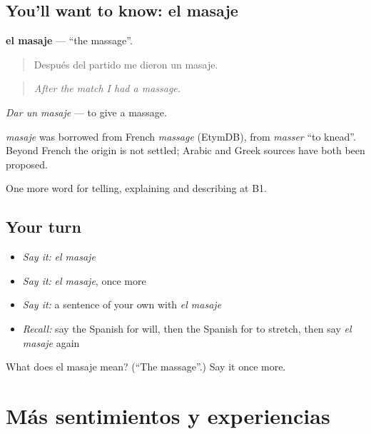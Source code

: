 \subsection*{You'll want to know: el masaje}
\textbf{el masaje} — \textquotedblleft{}the massage\textquotedblright{}.

\begin{quote}
Después del partido me dieron un masaje.
\end{quote}

\begin{quote}
\emph{After the match I had a massage.}
\end{quote}

\emph{Dar un masaje} — to give a massage.

\begin{cousinweb}
\emph{masaje} was borrowed from French \emph{massage} (EtymDB), from \emph{masser} \textquotedblleft{}to knead\textquotedblright{}. Beyond French the origin is not settled; Arabic and Greek sources have both been proposed.
\end{cousinweb}

\begin{grammarlens}[title={What you've built}]
One more word for telling, explaining and describing at B1.
\end{grammarlens}

\subsection*{Your turn}
\begin{itemize}
\raggedright
  \item \emph{Say it:} \emph{el masaje}
  \item \emph{Say it:} \emph{el masaje}, once more
  \item \emph{Say it:} a sentence of your own with \emph{el masaje}
  \item \emph{Recall:} say the Spanish for will, then the Spanish for to stretch, then say \emph{el masaje} again
\end{itemize}

\begin{tcolorbox}[breakable,colback=teal!4,colframe=teal!35!black,title={Before you move on}]
What does el masaje mean? (\textquotedblleft{}The massage\textquotedblright{}.) Say it once more.
\end{tcolorbox}
\section[(dialogue)]{Más sentimientos y experiencias}

